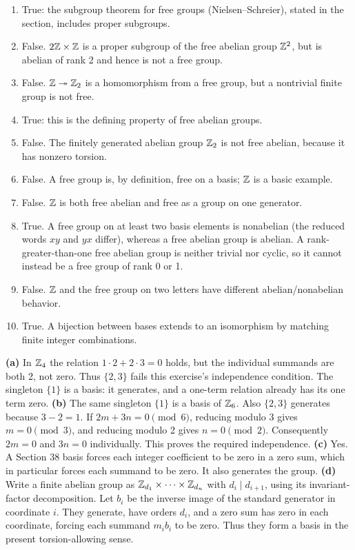\begin{enumerate}[label=\textbf{(\alph*)}]
\item True: the subgroup theorem for free groups (Nielsen--Schreier), stated in the section, includes proper subgroups.
\item False. $2\mathbb{Z}\times\mathbb{Z}$ is a proper subgroup of the free abelian group $\mathbb{Z}^2$, but is abelian of rank 2 and hence is not a free group.
\item False. $\mathbb{Z}\twoheadrightarrow\mathbb{Z}_2$ is a homomorphism from a free group, but a nontrivial finite group is not free.
\item True: this is the defining property of free abelian groups.
\item False. The finitely generated abelian group $\mathbb{Z}_2$ is not free abelian, because it has nonzero torsion.
\item False. A free group is, by definition, free on a basis; $\mathbb{Z}$ is a basic example.
\item False. $\mathbb{Z}$ is both free abelian and free as a group on one generator.
\item True. A free group on at least two basis elements is nonabelian (the reduced words $xy$ and $yx$ differ), whereas a free abelian group is abelian. A rank-greater-than-one free abelian group is neither trivial nor cyclic, so it cannot instead be a free group of rank 0 or 1.
\item False. $\mathbb{Z}$ and the free group on two letters have different abelian/nonabelian behavior.
\item True. A bijection between bases extends to an isomorphism by matching finite integer combinations.
\end{enumerate}

\textbf{(a)} In $\mathbb{Z}_4$ the relation $1\cdot2+2\cdot3=0$ holds, but the individual summands are both 2, not zero. Thus $\{2,3\}$ fails this exercise's independence condition. The singleton $\{1\}$ is a basis: it generates, and a one-term relation already has its one term zero.
\textbf{(b)} The same singleton $\{1\}$ is a basis of $\mathbb{Z}_6$. Also $\{2,3\}$ generates because $3-2=1$. If $2m+3n=0\pmod6$, reducing modulo 3 gives $m=0\pmod3$, and reducing modulo 2 gives $n=0\pmod2$. Consequently $2m=0$ and $3n=0$ individually. This proves the required independence.
\textbf{(c)} Yes. A Section 38 basis forces each integer coefficient to be zero in a zero sum, which in particular forces each summand to be zero. It also generates the group.
\textbf{(d)} Write a finite abelian group as $\mathbb{Z}_{d_1}\times\cdots\times\mathbb{Z}_{d_n}$ with $d_i\mid d_{i+1}$, using its invariant-factor decomposition. Let $b_i$ be the inverse image of the standard generator in coordinate $i$. They generate, have orders $d_i$, and a zero sum has zero in each coordinate, forcing each summand $m_ib_i$ to be zero. Thus they form a basis in the present torsion-allowing sense.

